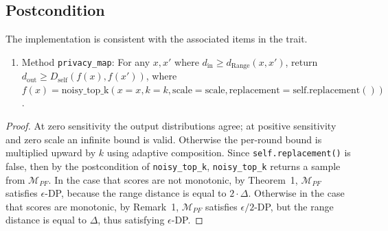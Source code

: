 \documentclass{article}
\begin{document}
\subsection*{Postcondition}
\begin{theorem}
    The implementation is consistent with the associated items in the  trait.
    \begin{enumerate}
        \item Method \texttt{privacy\_map}:
        For any $x, x'$ where $d_\mathrm{in} \ge d_\mathrm{Range}(x, x')$,
        return $d_\mathrm{out} \ge D_\mathrm{self}(f(x), f(x'))$,
        where $f(x) = \mathrm{noisy\_top\_k}(x=x, k=k, \mathrm{scale}=\mathrm{scale}, \mathrm{replacement}=\mathrm{self.replacement()})$.
    \end{enumerate}
\end{theorem}

\begin{proof}
    At zero sensitivity the output distributions agree; at positive sensitivity and zero scale an infinite bound is valid.
    Otherwise the per-round bound is multiplied upward by $k$ using adaptive composition.
    Since \texttt{self.replacement()} is false, then by the postcondition of \texttt{noisy\_top\_k},
    \texttt{noisy\_top\_k} returns a sample from $\mathcal{M}_{PF}$.
    In the case that scores are not monotonic,
    by \cite{mckenna2020permute} Theorem~1, $\mathcal{M}_{PF}$ satisfies $\epsilon$-DP,
    because the range distance is equal to $2 \cdot \Delta$.
    Otherwise in the case that scores are monotonic,
    by \cite{mckenna2020permute} Remark~1, $\mathcal{M}_{PF}$ satisfies $\epsilon/2$-DP,
    but the range distance is equal to $\Delta$, thus satisfying $\epsilon$-DP.
\end{proof}


\end{document}
